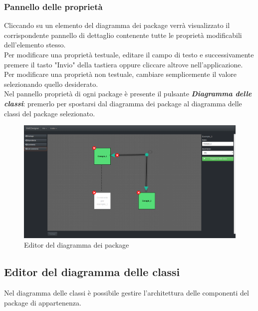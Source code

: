 \documentclass[../ManualeUtente.tex]{subfiles}
\begin{document}
			\subsubsection{Pannello delle proprietà}
				Cliccando su un elemento del diagramma dei package verrà visualizzato il corrispondente pannello
				di dettaglio contenente tutte le proprietà modificabili dell'elemento stesso.\\
				Per modificare una proprietà testuale, editare il campo di testo e successivamente premere il
				tasto "Invio" della tastiera oppure cliccare altrove nell'applicazione.\\
				Per modificare una proprietà non testuale, cambiare semplicemente il valore selezionando quello
				desiderato.\\
				Nel pannello proprietà di ogni package è presente il pulsante
				\textit{\textbf{Diagramma delle classi}}: premerlo per spostarsi dal diagramma dei package al
				diagramma delle classi del package selezionato.
			\begin{figure} [h!]
				\centering
				\includegraphics[scale=0.24]{./Immagini/PackageDiagram.png}
				\caption{Editor del diagramma dei package}\label{fig:PackageDiagram}
			\end{figure}
		\newpage
		\subsection{Editor del diagramma delle classi}
			Nel diagramma delle classi è possibile gestire l'architettura delle componenti del package di
			appartenenza.
\end{document}
